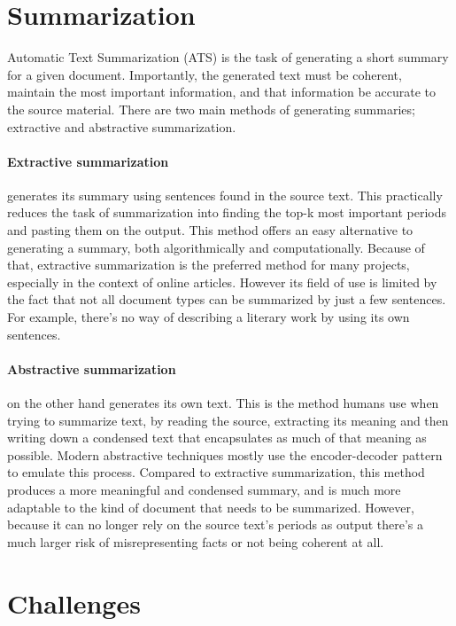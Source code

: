 \documentclass{article}
\begin{document}
	
	\section{Summarization}
	
	Automatic Text Summarization (ATS) is the task of generating a short summary for a given document. Importantly, the generated text must be coherent, maintain the most important information, and that information be accurate to the source material. There are two main methods of generating summaries; extractive and abstractive summarization. \par
	
	\paragraph{Extractive summarization} generates its summary using sentences found in the source text. This practically reduces the task of summarization into finding the top-k most important periods and pasting them on the output. This method offers an easy alternative to generating a summary, both algorithmically and computationally. Because of that, extractive summarization is the preferred method for many projects, especially in the context of online articles. However its field of use is limited by the fact that not all document types can be summarized by just a few sentences. For example, there's no way of describing a literary work by using its own sentences.
	
	\paragraph{Abstractive summarization} on the other hand generates its own text. This is the method humans use when trying to summarize text, by reading the source, extracting its meaning and then writing down a condensed text that encapsulates as much of that meaning as possible. Modern abstractive techniques mostly use the encoder-decoder pattern to emulate this process. Compared to extractive summarization, this method produces a more meaningful and condensed summary, and is much more adaptable to the kind of document that needs to be summarized. However, because it can no longer rely on the source text's periods as output there's a much larger risk of misrepresenting facts or not being coherent at all.
	
	
	\section{Challenges}
	
\end{document}

